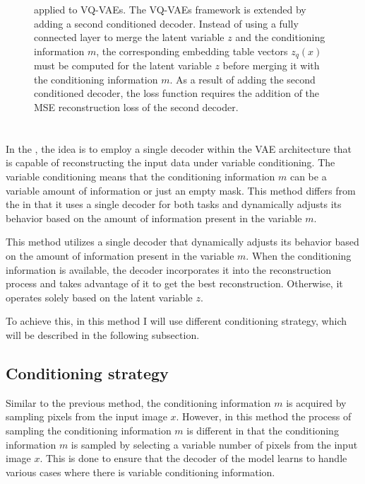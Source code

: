 \begin{figure}[H]
    \centering
    
    \caption[ applied to VQ-VAEs.]%
    {
         applied to VQ-VAEs. The VQ-VAEs framework is extended by adding a second conditioned decoder. Instead of using a fully connected layer to merge the latent variable $z$ and the conditioning information $m$, the corresponding embedding table vectors $z_q(x)$ must be computed for the latent variable $z$ before merging it with the conditioning information $m$. As a result of adding the second conditioned decoder, the loss function requires the addition of the MSE reconstruction loss of the second decoder.
    }\label{SCVQVAE2DFigure}
\end{figure}

\section{}

In the , the idea is to employ a single decoder within the VAE architecture that is capable of reconstructing the input data under variable conditioning. The variable conditioning means that the conditioning information $m$ can be a variable amount of information or just an empty mask. This method differs from the  in that it uses a single decoder for both tasks and dynamically adjusts its behavior based on the amount of information present in the variable $m$.

This method utilizes a single decoder that dynamically adjusts its behavior
based on the amount of information present in the variable $m$. When the
conditioning information is available, the decoder incorporates it into the
reconstruction process and takes advantage of it to get the best
reconstruction. Otherwise, it operates solely based on the latent variable $z$.

To achieve this, in this method I will use different conditioning strategy, which will be described in the following subsection.

\subsection{Conditioning strategy}

Similar to the previous method, the conditioning information $m$ is acquired by
sampling pixels from the input image $x$. However, in this method the process of sampling the conditioning information $m$ is different in that the conditioning information $m$ is sampled by selecting a variable number of pixels from the input image $x$. This is done to ensure that the decoder of the model learns to handle various cases where there is variable conditioning information.

